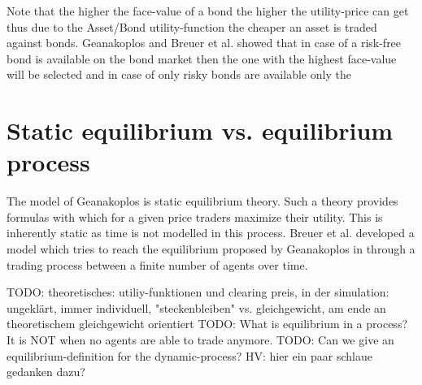 \documentclass[../Bachelorarbeit.tex]{subfiles}
\begin{document}
Note that the higher the face-value of a bond the higher the utility-price can get thus due to the Asset/Bond utility-function the cheaper an asset is traded against bonds. Geanakoplos and Breuer et al. showed that in case of a risk-free bond is available on the bond market then the one with the highest face-value will be selected and in case of only risky bonds are available only the 


\section{Static equilibrium vs. equilibrium process}
The model of Geanakoplos is static equilibrium theory. Such a theory provides formulas with which for a given price traders maximize their utility. This is inherently static as time is not modelled in this process. Breuer et al. developed a model which tries to reach the equilibrium proposed by Geanakoplos in \cite{Geanakoplos2009} through a trading process between a finite number of agents over time.

\medskip

TODO: theoretisches: utiliy-funktionen und clearing preis, in der simulation: ungeklärt, immer individuell, "steckenbleiben" vs. gleichgewicht, am ende an theoretischem gleichgewicht orientiert
TODO: What is equilibrium in a process? It is NOT when no agents are able to trade anymore.
TODO: Can we give an equilibrium-definition for the dynamic-process? HV: hier ein paar schlaue gedanken dazu?
\end{document}
